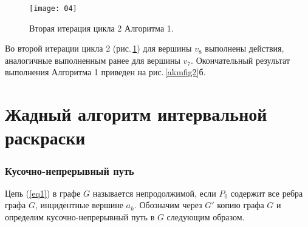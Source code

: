 %
\begin{figure}[H]
{\texttt{[image: 04]}}
\caption{Вторая итерация цикла 2 Алгоритма 1.}
\label{akmfig4}
\end{figure}
\par\medskip\medskip
Во второй итерации цикла 2 (рис.\,\ref{akmfig4}) для вершины $v_8$ выполнены действия, аналогичные выполненным ранее для вершины $v_7$. Окончательный результат выполнения Алгоритма 1 приведен на рис.\,\ref{akmfig2}б.

\section{Жадный алгоритм интервальной раскраски}\label{akm-ss3}
\subsubsection {Кусочно-непрерывный путь}\label{akm-ss4}
\label{subsec21}
Цепь (\ref{eq1}) в графе $G$ называется непродолжимой, если $P_0$ содержит все ребра графа $G$, инцидентные вершине $a_k$. Обозначим через $G'$ копию графа $G$ и определим кусочно-непрерывный путь в $G$ следующим образом.

